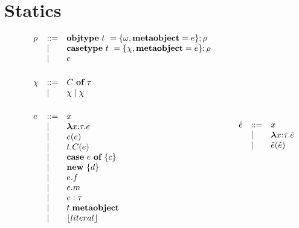 \section{Statics}


\begin{figure}
\centering
\[
\begin{array}{lll}
\rho & \bnfdef & \keyw{objtype}~ t~ = \{ \omega, \keyw{metaobject}=e \}; \rho \\
     & \bnfalt & \keyw{casetype}~ t~ = \{ \chi, \keyw{metaobject}=e \}; \rho\\
     & \bnfalt & e\\
     \\[1ex]
\chi & \bnfdef & C~\keyw{of}~\tau\\
     & \bnfalt & \chi \bnfalt \chi \\
\\[1ex]
e    & \bnfdef & x \\
     & \bnfalt & \boldsymbol\lambda x{:}\tau . e \\ %
     & \bnfalt & e(e) \\
     & \bnfalt & t.C(e) \\
     & \bnfalt & \keyw{case}~e~\keyw{of}~\{ c \} \\
     & \bnfalt & \keyw{new}~ \{ d \}\\
     & \bnfalt & e.f \\
     & \bnfalt & e.m \\
     & \bnfalt & e : \tau\\
     & \bnfalt & t.\keyw{metaobject}\\
     & \bnfalt & \lfloor literal \rfloor \\
\\[1ex]	 
\end{array}
\begin{array}{lll}
~~~~
\end{array}
\begin{array}{lll}
\hat{e}    & \bnfdef & x \\
     & \bnfalt & \boldsymbol\lambda x{:}\tau . \hat{e} \\ %
     & \bnfalt & \hat{e}(\hat{e}) \\

\end{array}\]
\end{figure}
